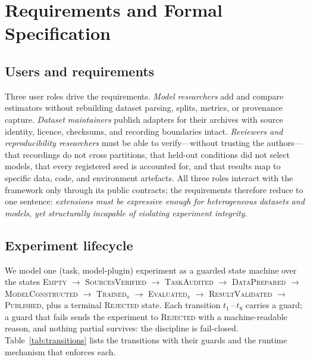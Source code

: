 \section{Requirements and Formal Specification}
\label{sec:spec}

\subsection{Users and requirements}

Three user roles drive the requirements. \emph{Model researchers} add and
compare estimators without rebuilding dataset parsing, splits, metrics, or
provenance capture. \emph{Dataset maintainers} publish adapters for their
archives with source identity, licence, checksums, and recording boundaries
intact. \emph{Reviewers and reproducibility researchers} must be able to
verify---without trusting the authors---that recordings do not cross
partitions, that held-out conditions did not select models, that every
registered seed is accounted for, and that results map to specific data,
code, and environment artefacts. All three roles interact with the framework
only through its public contracts; the requirements therefore reduce to one
sentence: \emph{extensions must be expressive enough for heterogeneous
datasets and models, yet structurally incapable of violating experiment
integrity}.

\subsection{Experiment lifecycle}

We model one (task, model-plugin) experiment as a guarded state machine over
the states
\textsc{Empty} $\rightarrow$ \textsc{SourcesVerified} $\rightarrow$
\textsc{TaskAudited} $\rightarrow$ \textsc{DataPrepared} $\rightarrow$
\textsc{ModelConstructed} $\rightarrow$ \textsc{Trained}$_s$ $\rightarrow$
\textsc{Evaluated}$_s$ $\rightarrow$ \textsc{ResultValidated} $\rightarrow$
\textsc{Published}, plus a terminal \textsc{Rejected} state. Each transition
$t_1$\,--\,$t_8$ carries a guard; a guard that fails sends the experiment to
\textsc{Rejected} with a machine-readable reason, and nothing partial
survives: the discipline is fail-closed. Table~\ref{tab:transitions} lists
the transitions with their guards and the runtime mechanism that enforces
each.

